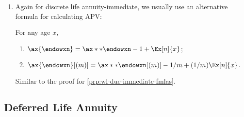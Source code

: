 \begin{enumerate}
\item Again for discrete life annuity-immediate, we usually use an alternative
formula for calculating APV:
\begin{proposition}
\label{prp:tmp-due-immediate-fmla}
For any age \(x\),
\begin{enumerate}
\item \(\ax{\endowxn}=\ax**{\endowxn}-1+\Ex[n]{x}\);
\item \(\ax{\endowxn}[(m)]=\ax**{\endowxn}[(m)]-1/m+(1/m)\Ex[n]{x}\).
\end{enumerate}
\end{proposition}
\begin{pf}
Similar to the proof for \cref{prp:wl-due-immediate-fmlas}.
\end{pf}
\end{enumerate}
\subsection{Deferred Life Annuity}
